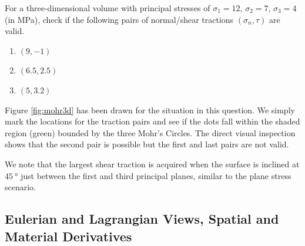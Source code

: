 \begin{exmp}
\label{exmp:mohr3d}
For a three-dimensional volume with principal stresses of $\sigma_1 = 12$, $\sigma_2 = 7$, $\sigma_3 = 4$ (in MPa), check if the following pairs of normal/shear tractions $(\sigma_n, \tau)$ are valid.
\begin{enumerate}[label=(\alph*)]
    \item $(9,-1)$
    \item $(6.5,2.5)$
    \item $(5,3.2)$
\end{enumerate}
\end{exmp}
\begin{solution}
Figure \ref{fig:mohr3d} has been drawn for the situation in this question. We simply mark the locations for the traction pairs and see if the dots fall within the shaded region (green) bounded by the three Mohr's Circles. The direct visual inspection shows that the second pair is possible but the first and last pairs are not valid.
\end{solution}
We note that the largest shear traction is acquired when the surface is inclined at $\SI{45}{\degree}$ just between the first and third principal planes, similar to the plane stress scenario.

\subsection{Eulerian and Lagrangian Views, Spatial and Material Derivatives}


